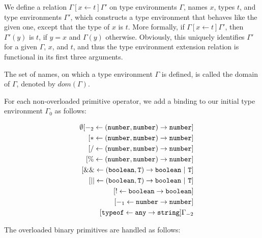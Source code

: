 We define a relation $\Gamma[x \leftarrow t]\Gamma'$ on type environments 
$\Gamma$, names $x$, types $t$, and type environments $\Gamma'$,
which constructs a type environment that behaves like the 
given one, except that the type of $x$ is $t$. More formally, 
if $\Gamma[x \leftarrow t]\Gamma'$, then $\Gamma'(y)$ is $t$, 
if $y=x$ and $\Gamma(y)$ 
otherwise. Obviously, this uniquely identifies $\Gamma'$ for
a given $\Gamma$, $x$, and $t$, and thus the type environment extension
relation is functional in its first three arguments.

The set of names, on which a type environment
$\Gamma$ is defined, is called the domain of $\Gamma$, 
denoted by $\textit{dom}(\Gamma)$.

For each non-overloaded primitive operator, we add a binding to our initial
type environment $\Gamma_0$ as follows:

\begin{eqnarray*}
& &
       \emptyset[ -_2 \leftarrow  (\texttt{number}, \texttt{number}) \rightarrow \texttt{number}]\\
&& \hspace{2mm} [ * \leftarrow  (\texttt{number}, \texttt{number}) \rightarrow \texttt{number}]\\
&& \hspace{2mm} [ / \leftarrow  (\texttt{number}, \texttt{number}) \rightarrow \texttt{number}]\\
&& \hspace{2mm} [ \% \leftarrow (\texttt{number}, \texttt{number}) \rightarrow \texttt{number}]\\
&& \hspace{2mm} [ \&\& \leftarrow (\texttt{boolean}, \texttt{T}) \rightarrow \texttt{boolean}\ |\ \texttt{T}]\\
&& \hspace{2mm} [ || \leftarrow   (\texttt{boolean}, \texttt{T}) \rightarrow \texttt{boolean}\ |\ \texttt{T}]\\
&& \hspace{2mm} [ ! \leftarrow \texttt{boolean} \rightarrow \texttt{boolean}]\\
&& \hspace{2mm} [ -_1 \leftarrow \texttt{number} \rightarrow \texttt{number}]\\
&& \hspace{2mm} [ \texttt{typeof} \leftarrow \texttt{any} \rightarrow \texttt{string}]\Gamma_{-2}
\end{eqnarray*}

The overloaded binary primitives are handled as follows:


